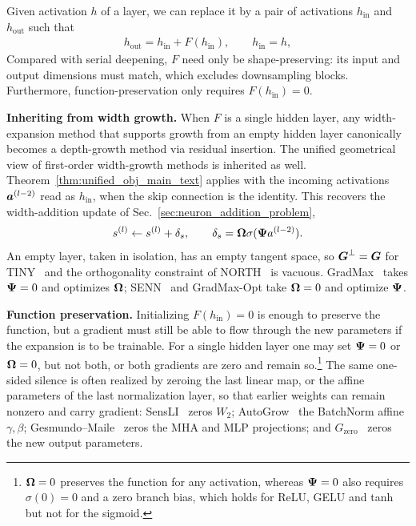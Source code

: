 Given activation $h$ of a layer, we can replace it by a pair of activations $h_{\mathrm{in}}$ and $h_{\mathrm{out}}$ such that
\begin{align}\label{eqn:residual_insertion}
h_{\mathrm{out}} = h_{\mathrm{in}} + F(h_{\mathrm{in}}),\qquad h_{\mathrm{in}}=h,
\end{align}
Compared with serial deepening, $F$ need only be shape-preserving: its input and output dimensions must match, which excludes downsampling blocks. Furthermore, function-preservation only requires $F(h_{\mathrm{in}}) = 0$.

\textbf{Inheriting from width growth.} When $F$ is a single hidden layer, any width-expansion method that supports growth from an empty hidden layer canonically becomes a depth-growth method via residual insertion. The unified geometrical view of first-order width-growth methods is inherited as well. Theorem~\ref{thm:unified_obj_main_text} applies with the incoming activations $\Postact[l-2]$ read as $h_{\mathrm{in}}$, when the skip connection is the identity. This recovers the width-addition update of Sec.~\ref{sec:neuron_addition_problem},
\begin{align}\label{eqn:residual_width}
\preact[l] \leftarrow \preact[l] + \deltas, \qquad \deltas = \Fanout\sigma(\Fanin \postact[l-2]).
\end{align}
An empty layer, taken in isolation, has an empty tangent space, so $\Bottleneck=\Gradpreact$ for TINY~\citep{verbockhaven_growing_2024} and the orthogonality constraint of NORTH~\citep{maile_when_2022} is vacuous. GradMax~\citep{evci_gradmax_2022} takes $\Fanin=0$ and optimizes $\Fanout$; SENN~\citep{mitchell_self-expanding_2024} and GradMax-Opt take $\Fanout=0$ and optimize $\Fanin$.

\textbf{Function preservation.} Initializing $F(h_{\mathrm{in}})=0$ is enough to preserve the function, but a gradient must still be able to flow through the new parameters if the expansion is to be trainable. For a single hidden layer one may set $\Fanin=0$ or $\Fanout=0$, but not both, or both gradients are zero and remain so.\footnote{$\Fanout = 0$ preserves the function for any activation, whereas $\Fanin = 0$ also requires $\sigma(0) = 0$ and a zero branch bias, which holds for ReLU, GELU and tanh but not for the sigmoid.} The same one-sided silence is often realized by zeroing the last linear map, or the affine parameters of the last normalization layer, so that earlier weights can remain nonzero and carry gradient: SensLI~\citep{kreisSensLISensitivityBasedLayer2026} zeros $W_2$; AutoGrow~\citep{wen_autogrow_2020} the BatchNorm affine $\gamma,\beta$; Gesmundo--Maile~\citep{gesmundo_composable_2023} zeros the MHA and MLP projections; and $G_{\mathrm{zero}}$~\citep{du_stacking_2024} zeros the new output parameters.

